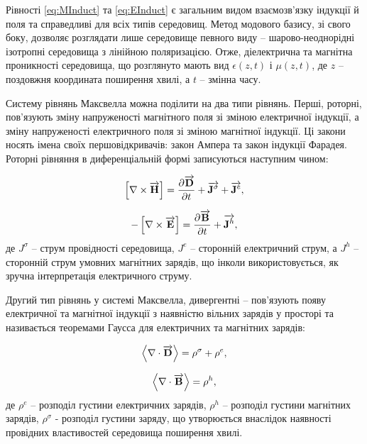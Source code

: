Рівності \eqref{eq:MInduct} та \eqref{eq:EInduct} є загальним видом 
взаємозв'язку індукції й поля та справедливі для всіх типів середовищ.
Метод модового базису, зі свого боку, дозволяє розглядати лише середовище 
певного виду -- шарово-неоднорідні ізотропні середовища з лінійною поляризацією.
Отже, діелектрична та магнітна проникності середовища, що розглянуто 
мають вид $ \epsilon(z,t) $ і $ \mu(z,t) $, де $ z $ -- поздовжня координата 
поширення хвилі, а $ t $ -- змінна часу.

Систему рівнянь Максвелла можна поділити на два типи рівнянь. Перші, роторні,
пов'язують зміну напруженості магнітного поля зі зміною електричної індукції, 
а зміну напруженості електричного поля зі зміною магнітної індукції. Ці закони 
носять імена своїх першовідкривачів: закон Ампера та закон індукції Фарадея.
Роторні рівняння в диференціальній формі записуються наступним чином:

\begin{equation} \label{eq:AmpereLow}
\left[ \nabla \times \overrightarrow{\mathbf H} \right] = 
\frac{\partial \overrightarrow{\mathbf D}}{\partial t} + \overrightarrow{\mathbf J^\sigma} + \overrightarrow{\mathbf J^e},
\end{equation}

\begin{equation} \label{eq:FaradayInduction}
- \left[ \nabla \times \overrightarrow{\mathbf E} \right] =
\frac{\partial \overrightarrow{\mathbf B}}{\partial t} + \overrightarrow{\mathbf J^h},
\end{equation}
%
де $ J^\sigma $ -- струм провідності середовища, $ J^e $ -- сторонній 
електричний струм, а $ J^h $ -- сторонній струм умовних магнітних зарядів, що
інколи використовується, як зручна інтерпретація електричного струму.

Другий тип рівнянь у системі Максвелла, дивергентні -- пов'язують появу 
електричної та магнітної індукції з наявністю вільних зарядів у просторі 
та називається теоремами Гаусса для електричних та магнітних зарядів:

\begin{equation} \label{eq:GaussTheorem}
\left< \nabla \cdot \overrightarrow{\mathbf D} \right> = \rho^\sigma + \rho^e,
\end{equation}

\begin{equation} \label{eq:GaussMagnetic}
\left< \nabla \cdot \overrightarrow{\mathbf B} \right> = \rho^h,
\end{equation}
%
де $ \rho^e $ -- розподіл густини електричних зарядів, $ \rho^h $ -- розподіл
густини магнітних зарядів, $ \rho^\sigma $ - розподіл густини заряду, що
утворюється внаслідок наявності провідних властивостей середовища 
поширення хвилі.

